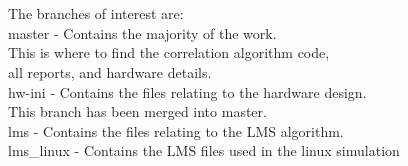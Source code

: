 \\
\\
The branches of interest are:\\
\indent	master - Contains the majority of the work.\\
\indent	\indent	 This is where to find the correlation algorithm code,\\
\indent	\indent	all reports, and hardware details.\\
\indent	hw-ini - Contains the files relating to the hardware design.\\
\indent	\indent	 This branch has been merged into master.\\
\indent	lms    - Contains the files relating to the LMS algorithm.\\
\indent	lms\_linux - Contains the LMS files used in the linux simulation

